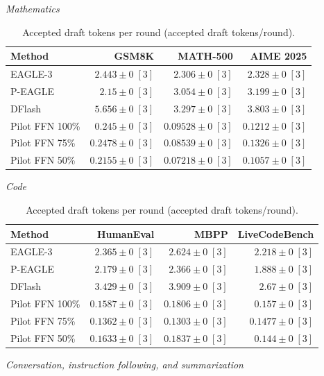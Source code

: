 \begin{table}[!htp]
\centering\small
\setlength{\tabcolsep}{3pt}
\caption{Accepted draft tokens per round (accepted draft tokens/round).}
\label{tab:appendix-metric-accepted-round-none}
\textit{Mathematics}\par\smallskip
\begin{tabular}{@{}>{\raggedright\arraybackslash}p{3.7cm}rrr@{}}
\toprule
Method & GSM8K & MATH-500 & AIME 2025 \\
\midrule
EAGLE-3 & \(2.443 \pm 0\;[3]\) & \(2.306 \pm 0\;[3]\) & \(2.328 \pm 0\;[3]\) \\
P-EAGLE & \(2.15 \pm 0\;[3]\) & \(3.054 \pm 0\;[3]\) & \(3.199 \pm 0\;[3]\) \\
DFlash & \(\mathbf{5.656} \pm 0\;[3]\) & \(\mathbf{3.297} \pm 0\;[3]\) & \(\mathbf{3.803} \pm 0\;[3]\) \\
Pilot FFN 100\% & \(0.245 \pm 0\;[3]\) & \(0.09528 \pm 0\;[3]\) & \(0.1212 \pm 0\;[3]\) \\
Pilot FFN 75\% & \(0.2478 \pm 0\;[3]\) & \(0.08539 \pm 0\;[3]\) & \(0.1326 \pm 0\;[3]\) \\
Pilot FFN 50\% & \(0.2155 \pm 0\;[3]\) & \(0.07218 \pm 0\;[3]\) & \(0.1057 \pm 0\;[3]\) \\
\bottomrule
\end{tabular}\par\medskip
\textit{Code}\par\smallskip
\begin{tabular}{@{}>{\raggedright\arraybackslash}p{3.7cm}rrr@{}}
\toprule
Method & HumanEval & MBPP & LiveCodeBench \\
\midrule
EAGLE-3 & \(2.365 \pm 0\;[3]\) & \(2.624 \pm 0\;[3]\) & \(2.218 \pm 0\;[3]\) \\
P-EAGLE & \(2.179 \pm 0\;[3]\) & \(2.366 \pm 0\;[3]\) & \(1.888 \pm 0\;[3]\) \\
DFlash & \(\mathbf{3.429} \pm 0\;[3]\) & \(\mathbf{3.909} \pm 0\;[3]\) & \(\mathbf{2.67} \pm 0\;[3]\) \\
Pilot FFN 100\% & \(0.1587 \pm 0\;[3]\) & \(0.1806 \pm 0\;[3]\) & \(0.157 \pm 0\;[3]\) \\
Pilot FFN 75\% & \(0.1362 \pm 0\;[3]\) & \(0.1303 \pm 0\;[3]\) & \(0.1477 \pm 0\;[3]\) \\
Pilot FFN 50\% & \(0.1633 \pm 0\;[3]\) & \(0.1837 \pm 0\;[3]\) & \(0.144 \pm 0\;[3]\) \\
\bottomrule
\end{tabular}\par\medskip
\textit{Conversation, instruction following, and summarization}\par\smallskip

\end{table}
